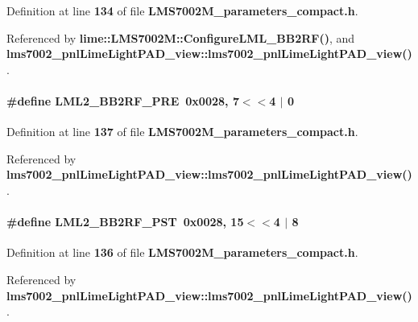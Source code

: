 Definition at line {\bf 134} of file {\bf L\+M\+S7002\+M\+\_\+parameters\+\_\+compact.\+h}.



Referenced by {\bf lime\+::\+L\+M\+S7002\+M\+::\+Configure\+L\+M\+L\+\_\+\+B\+B2\+R\+F()}, and {\bf lms7002\+\_\+pnl\+Lime\+Light\+P\+A\+D\+\_\+view\+::lms7002\+\_\+pnl\+Lime\+Light\+P\+A\+D\+\_\+view()}.

\paragraph[{L\+M\+L2\+\_\+\+B\+B2\+R\+F\+\_\+\+P\+RE}]{\setlength{\rightskip}{0pt plus 5cm}\#define L\+M\+L2\+\_\+\+B\+B2\+R\+F\+\_\+\+P\+RE~0x0028, 7$<$$<$4 $\vert$  0}\label{LMS7002M__parameters__compact_8h_aa00dfb6f5827cad5c56db5c60fb0af8f}


Definition at line {\bf 137} of file {\bf L\+M\+S7002\+M\+\_\+parameters\+\_\+compact.\+h}.



Referenced by {\bf lms7002\+\_\+pnl\+Lime\+Light\+P\+A\+D\+\_\+view\+::lms7002\+\_\+pnl\+Lime\+Light\+P\+A\+D\+\_\+view()}.

\paragraph[{L\+M\+L2\+\_\+\+B\+B2\+R\+F\+\_\+\+P\+ST}]{\setlength{\rightskip}{0pt plus 5cm}\#define L\+M\+L2\+\_\+\+B\+B2\+R\+F\+\_\+\+P\+ST~0x0028, 15$<$$<$4 $\vert$  8}\label{LMS7002M__parameters__compact_8h_abc4271846f614f80ffc9033a7db97591}


Definition at line {\bf 136} of file {\bf L\+M\+S7002\+M\+\_\+parameters\+\_\+compact.\+h}.



Referenced by {\bf lms7002\+\_\+pnl\+Lime\+Light\+P\+A\+D\+\_\+view\+::lms7002\+\_\+pnl\+Lime\+Light\+P\+A\+D\+\_\+view()}.

